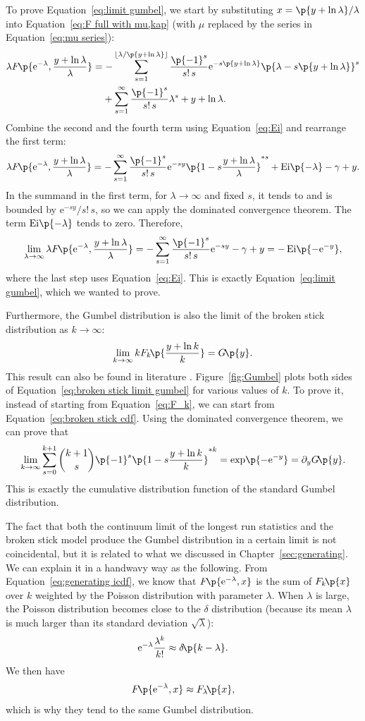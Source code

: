 \documentclass[oneside,12pt,final]{ucthesis-CA2012}
\newcommand{\mrm}[1]{\mathrm{#1}}
\newcommand{\gma}{\gamma}
\newcommand{\dlt}{\delta}
\newcommand{\lmd}{\lambda}
\newcommand{\e}{\mrm{e}}
\newcommand{\fr}{\frac}
\newcommand{\opn}{\operatorname}
\newcommand{\fc}[2]{#1\mathchoice{\!}{\!}{}{}\p{#2}} %
\newcommand{\opc}[2]{\fc{\opn{#1}}{#2}} %
\newcommand\floor[1]{\left\lfloor#1\right\rfloor}
\begin{document}
\begin{mainmatter}
To prove Equation~\ref{eq:limit gumbel}, we start by substituting $x=\p{y+\ln\lmd}/\lmd$
into Equation~\ref{eq:F full with mu,kap}
(with $\mu$ replaced by the series in Equation~\ref{eq:mu series}):
\begin{align*}
	\lmd\fc F{\e^{-\lmd},\fr{y+\ln\lmd}\lmd}
	&=-\sum_{s=1}^{\floor{\lmd/\p{y+\ln\lmd}}}\fr{\p{-1}^s}{s!\,s}\e^{-s\p{y+\ln\lmd}}
	\p{\lmd-s\p{y+\ln\lmd}}^s\\
	&\phantom{={}}{}+\sum_{s=1}^\infty\fr{\p{-1}^s}{s!\,s}\lmd^s+y+\ln\lmd.
\end{align*}
Combine the second and the fourth term using Equation~\ref{eq:Ei} and rearrange the first term:
\[\lmd\fc F{\e^{-\lmd},\fr{y+\ln\lmd}\lmd}
=-\sum_{s=1}^\infty\fr{\p{-1}^s}{s!\,s}\e^{-sy}\p{1-s\fr{y+\ln\lmd}\lmd}^{*s}
+\opc{Ei}{-\lmd}-\gma+y.\]
In the summand in the first term, for $\lmd\to\infty$ and fixed $s$,
it tends to and is bounded by $\e^{-sy}/s!\,s$, so we can apply the dominated convergence theorem.
The term $\opc{Ei}{-\lmd}$ tends to zero.
Therefore,
\[\lim_{\lmd\to\infty}\lmd\fc F{\e^{-\lmd},\fr{y+\ln\lmd}\lmd}
=-\sum_{s=1}^\infty\fr{\p{-1}^s}{s!\,s}\e^{-sy}-\gma+y=-\opc{Ei}{-\e^{-y}},\]
where the last step uses Equation~\ref{eq:Ei}.
This is exactly Equation~\ref{eq:limit gumbel}, which we wanted to prove.

Furthermore, the Gumbel distribution is also
the limit of the broken stick distribution as $k\to\infty$:
\begin{equation}
	\label{eq:broken stick limit gumbel}
	\lim_{k\to\infty}k\fc{F_k}{\fr{y+\ln k}k}=\fc Gy.
\end{equation}
This result can also be found in literature \cite{Bairamov_Berred_Stepanov_2010}.
Figure~\ref{fig:Gumbel} plots both sides of Equation~\ref{eq:broken stick limit gumbel}
for various values of $k$.
To prove it, instead of starting from Equation~\ref{eq:F_k},
we can start from Equation~\ref{eq:broken stick cdf}.
Using the dominated convergence theorem, we can prove that
\[\lim_{k\to\infty}\sum_{s=0}^{k+1}\binom{k+1}s\p{-1}^s\p{1-s\fr{y+\ln k}k}^{*k}
=\fc\exp{-\e^{-y}}=\partial_y\fc Gy.\]
This is exactly the cumulative distribution function of the standard Gumbel distribution.

The fact that both the continuum limit of the longest run statistics
and the broken stick model produce the Gumbel distribution in a certain limit
is not coincidental,
but it is related to what we discussed in Chapter~\ref{sec:generating}.
We can explain it in a handwavy way as the following.
From Equation~\ref{eq:generating icdf}, we know that $\fc F{\e^{-\lmd},x}$
is the sum of $\fc{F_k}x$ over $k$ weighted by the Poisson distribution with parameter $\lmd$.
When $\lmd$ is large, the Poisson distribution becomes close to the $\dlt$ distribution
(because its mean $\lmd$ is much larger than its standard deviation $\sqrt\lmd$):
\[\e^{-\lmd}\fr{\lmd^k}{k!}\approx\fc\dlt{k-\lmd}.\]
We then have
\[\fc F{\e^{-\lmd},x}\approx\fc{F_\lmd}x,\]
which is why they tend to the same Gumbel distribution.


\end{mainmatter}
\end{document}
